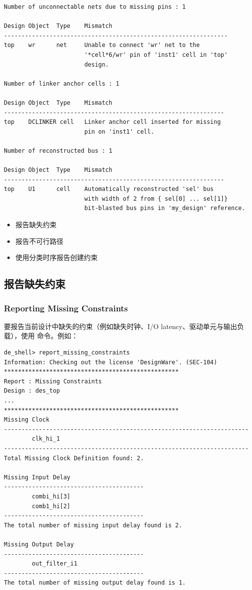 \begin{itemize}
\begin{lstlisting}
Number of unconnectable nets due to missing pins : 1

Design Object  Type    Mismatch
----------------------------------------------------------------
top    wr      net     Unable to connect 'wr' net to the
                       '*cell*6/wr' pin of 'inst1' cell in 'top'
                       design.

Number of linker anchor cells : 1

Design Object  Type    Mismatch
---------------------------------------------------------------
top    DCLINKER cell   Linker anchor cell inserted for missing
                       pin on 'inst1' cell.

Number of reconstructed bus : 1

Design Object  Type    Mismatch
---------------------------------------------------------------
top    U1      cell    Automatically reconstructed 'sel' bus
                       with width of 2 from { sel[0] ... sel[1]}
                       bit-blasted bus pins in 'my_design' reference.
\end{lstlisting}
\end{itemize}

\begin{seeAlsoBox}
\begin{itemize}
  \item 报告缺失约束
  \item 报告不可行路径
  \item 使用分类时序报告创建约束
\end{itemize}
\end{seeAlsoBox}

\subsection{报告缺失约束}
\subsubsection*{Reporting Missing Constraints}

要报告当前设计中缺失的约束（例如缺失时钟、I/O latency、驱动单元与输出负载），使用  命令。例如：
\begin{lstlisting}
de_shell> report_missing_constraints
Information: Checking out the license 'DesignWare'. (SEC-104)
**************************************************
Report : Missing Constraints
Design : des_top
...
**************************************************
Missing Clock
----------------------------------------------------------------------
        clk_hi_1
----------------------------------------------------------------------
Total Missing Clock Definition found: 2.

Missing Input Delay
----------------------------------------
        combi_hi[3]
        comb1_hi[2]
----------------------------------------
The total number of missing input delay found is 2.

Missing Output Delay
----------------------------------------
        out_filter_i1
----------------------------------------
The total number of missing output delay found is 1.
\end{lstlisting}

